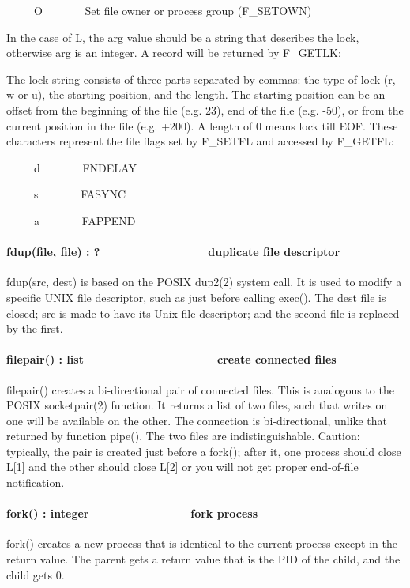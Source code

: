 \ \ \ \ \ O \ \ \ \ \ \ \ Set file owner or process group (F\_SETOWN)

In the case of L, the arg value should be a string that describes the
lock, otherwise arg is an integer. A record will be returned by
F\_GETLK: 


The lock string consists of three parts separated by commas: the type of
lock (r, w or u), the starting position, and the length. The starting
position can be an offset from the beginning of the file (e.g. 23), end
of the file (e.g. -50), or from the current position in the file (e.g.
+200). A length of 0 means lock till EOF. These characters represent
the file flags set by F\_SETFL and accessed by F\_GETFL: 

\ \ \ \ \ d \ \ \ \ \ \ \ FNDELAY 

\ \ \ \ \ s \ \ \ \ \ \ \ FASYNC 

\ \ \ \ \ a \ \ \ \ \ \ \ FAPPEND 

\paragraph[fdup(file, file) : ?\ \ \ \ \ \ \ \ \ \ \ \ 
\ \ \ \ \ duplicate file descriptor]{fdup(file, file) :
?\ \ \ \ \ \ \ \ \ \ \ \  \ \ \ \ \ duplicate file descriptor}
fdup(src, dest) is based on the POSIX dup2(2) system call. It is used to
modify a specific UNIX file descriptor, such as just before calling
exec(). The dest file is closed; src is made to have its Unix file
descriptor; and the second file is replaced by the first. 

\paragraph[filepair() : list\ \ \ \ \ \ \ \ \ \ \ \ \ \ 
\ \ \ \ \ \ \ create connected files]{filepair() :
list\ \ \ \ \ \ \ \ \ \ \ \ \ \  \ \ \ \ \ \ \ create connected files}
filepair() creates a bi-directional pair of connected files. This is
analogous to the POSIX socketpair(2) function. It returns a list of two
files, such that writes on one will be available on the other. The
connection is bi-directional, unlike that returned by function pipe().
The two files are indistinguishable. Caution: typically, the pair is
created just before a fork(); after it, one process should close L[1]
and the other should close L[2] or you will not get proper end-of-file
notification. 

\paragraph[fork() : integer\ \ \ \ \ \ \ \ \ \ \ \ \ \ \ \  fork
process]{fork() : integer\ \ \ \ \ \ \ \ \ \ \ \ \ \ \ \  fork process}
fork() creates a new process that is identical to the current process
except in the return value. The parent gets a return value that is the
PID of the child, and the child gets 0.

